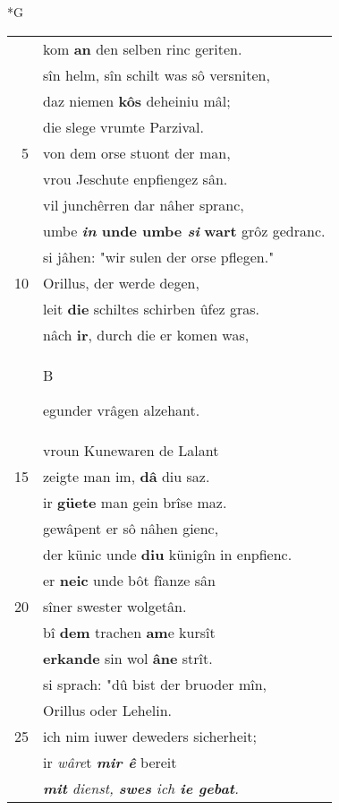 \documentclass[8pt,a4paper,notitlepage]{article}
\begin{document}
\begin{table}[ht]
\begin{minipage}[t]{0.5\linewidth}
\small
\begin{center}*G
\end{center}
\begin{tabular}{rl}
 & kom \textbf{an} den selben rinc geriten.\\ 
 & sîn helm, sîn schilt was sô versniten,\\ 
 & daz niemen \textbf{kôs} deheiniu mâl;\\ 
 & die slege vrumte Parzival.\\ 
5 & von dem orse stuont der man,\\ 
 & vrou Jeschute enpfiengez sân.\\ 
 & vil junchêrren dar nâher spranc,\\ 
 & umbe \textbf{\textit{in} unde umbe \textit{si}} \textbf{wart} grôz gedranc.\\ 
 & si jâhen: "wir sulen der orse pflegen."\\ 
10 & Orillus, der werde degen,\\ 
 & leit \textbf{die} schiltes schirben ûfez gras.\\ 
 & nâch \textbf{ir}, durch die er komen was,\\ 
 & \begin{large}B\end{large}egunder vrâgen alzehant.\\ 
 & vroun Kunewaren de Lalant\\ 
15 & zeigte man im, \textbf{dâ} diu saz.\\ 
 & ir \textbf{güete} man gein brîse maz.\\ 
 & gewâpent er sô nâhen gienc,\\ 
 & der künic unde \textbf{diu} künigîn in enpfienc.\\ 
 & er \textbf{neic} unde bôt fîanze sân\\ 
20 & sîner swester wolgetân.\\ 
 & bî \textbf{dem} trachen \textbf{am}e kursît\\ 
 & \textbf{erkande} sin wol \textbf{âne} strît.\\ 
 & si sprach: "dû bist der bruoder mîn,\\ 
 & Orillus oder Lehelin.\\ 
25 & ich nim iuwer deweders sicherheit;\\ 
 & ir \textit{wâre}t \textit{\textbf{mir ê}} bereit\\ 
 & \textit{\textbf{mit} dienst, \textbf{swes} ich \textbf{ie gebat}.}\\ 

\end{tabular}
\end{minipage}
\end{table}
\end{document}
